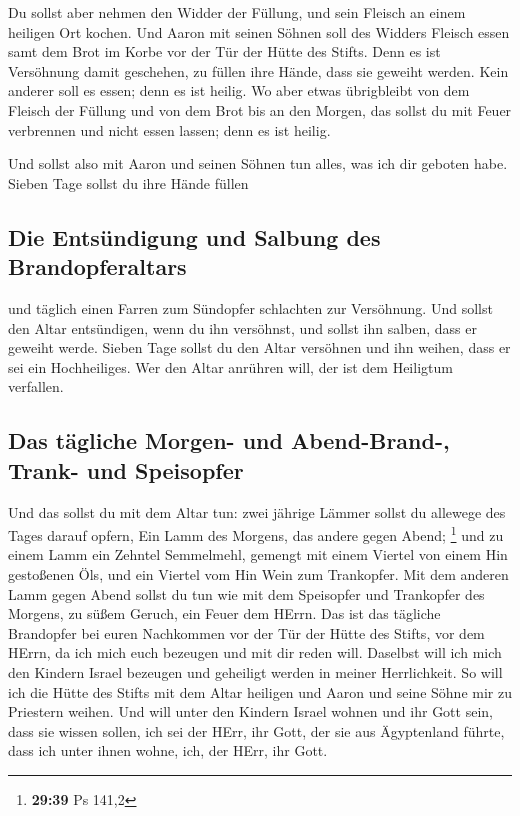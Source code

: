  Du sollst aber nehmen den Widder der Füllung, und sein
Fleisch an einem heiligen Ort kochen.  Und Aaron mit
seinen Söhnen soll des Widders Fleisch essen samt dem Brot im Korbe vor
der Tür der Hütte des Stifts.  Denn es ist Versöhnung
damit geschehen, zu füllen ihre Hände, dass sie geweiht werden. Kein
anderer soll es essen; denn es ist heilig.  Wo aber etwas
übrigbleibt von dem Fleisch der Füllung und von dem Brot bis an den
Morgen, das sollst du mit Feuer verbrennen und nicht essen lassen; denn
es ist heilig.

 Und sollst also mit Aaron und seinen Söhnen tun alles,
was ich dir geboten habe. Sieben Tage sollst du ihre Hände füllen

\hypertarget{die-entsuxfcndigung-und-salbung-des-brandopferaltars}{%
\subsection{Die Entsündigung und Salbung des
Brandopferaltars}\label{die-entsuxfcndigung-und-salbung-des-brandopferaltars}}

 und täglich einen Farren zum Sündopfer schlachten zur
Versöhnung. Und sollst den Altar entsündigen, wenn du ihn versöhnst, und
sollst ihn salben, dass er geweiht werde.  Sieben Tage
sollst du den Altar versöhnen und ihn weihen, dass er sei ein
Hochheiliges. Wer den Altar anrühren will, der ist dem Heiligtum
verfallen.

\hypertarget{das-tuxe4gliche-morgen--und-abend-brand--trank--und-speisopfer}{%
\subsection{Das tägliche Morgen- und Abend-Brand-, Trank- und
Speisopfer}\label{das-tuxe4gliche-morgen--und-abend-brand--trank--und-speisopfer}}

 Und das sollst du mit dem Altar tun: zwei jährige Lämmer
sollst du allewege des Tages darauf opfern,  Ein Lamm des
Morgens, das andere gegen Abend; \footnote{\textbf{29:39} Ps 141,2}
 und zu einem Lamm ein Zehntel Semmelmehl, gemengt mit
einem Viertel von einem Hin gestoßenen Öls, und ein Viertel vom Hin Wein
zum Trankopfer.  Mit dem anderen Lamm gegen Abend sollst
du tun wie mit dem Speisopfer und Trankopfer des Morgens, zu süßem
Geruch, ein Feuer dem HErrn.  Das ist das tägliche
Brandopfer bei euren Nachkommen vor der Tür der Hütte des Stifts, vor
dem HErrn, da ich mich euch bezeugen und mit dir reden will.
 Daselbst will ich mich den Kindern Israel bezeugen und
geheiligt werden in meiner Herrlichkeit.  So will ich die
Hütte des Stifts mit dem Altar heiligen und Aaron und seine Söhne mir zu
Priestern weihen.  Und will unter den Kindern Israel
wohnen und ihr Gott sein,  dass sie wissen sollen, ich
sei der HErr, ihr Gott, der sie aus Ägyptenland führte, dass ich unter
ihnen wohne, ich, der HErr, ihr Gott.

